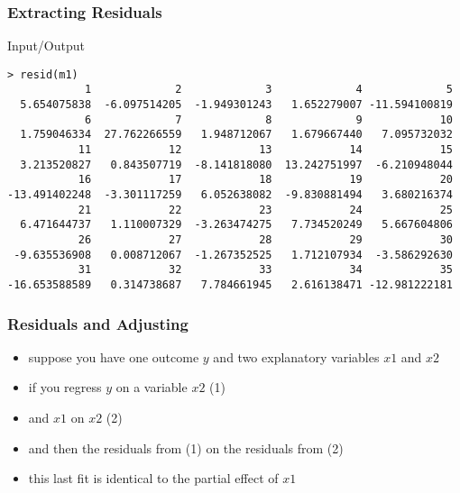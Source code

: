 \begin{frame}[fragile]\frametitle{Extracting Residuals}
  \begin{exampleblock}{Input/Output}\scriptsize
\begin{verbatim}
> resid(m1)
            1             2             3             4             5 
  5.654075838  -6.097514205  -1.949301243   1.652279007 -11.594100819 
            6             7             8             9            10 
  1.759046334  27.762266559   1.948712067   1.679667440   7.095732032 
           11            12            13            14            15 
  3.213520827   0.843507719  -8.141818080  13.242751997  -6.210948044 
           16            17            18            19            20 
-13.491402248  -3.301117259   6.052638082  -9.830881494   3.680216374
           21            22            23            24            25 
  6.471644737   1.110007329  -3.263474275   7.734520249   5.667604806 
           26            27            28            29            30 
 -9.635536908   0.008712067  -1.267352525   1.712107934  -3.586292630 
           31            32            33            34            35 
-16.653588589   0.314738687   7.784661945   2.616138471 -12.981222181 
\end{verbatim}
  \end{exampleblock}
\end{frame}


\begin{frame}[fragile]\frametitle{Residuals and Adjusting}
  \begin{itemize}
  \item suppose you have one outcome $y$ and two explanatory variables $x1$ and $x2$
  \item if you regress $y$ on a variable $x2$ (1)
  \item and $x1$ on $x2$ (2)
  \item and then the residuals from (1) on the residuals from (2)
  \item this last fit is identical to the partial effect of $x1$
  \end{itemize}
\end{frame}

